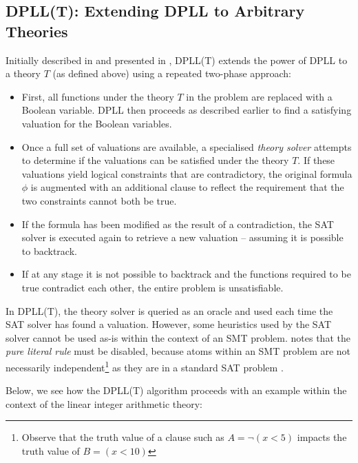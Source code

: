 \documentclass[a4paper,openany,12pt]{book}
\begin{document}
\subsection{DPLL(T): Extending DPLL to Arbitrary Theories}
\label{dpllt}
Initially described in \citet{ganzinger2004dpll} and presented in \citet{russell2016artificial}, DPLL(T) extends the
power of DPLL to a theory $T$ (as defined above) using a repeated two-phase approach:

\begin{itemize}
    \item First, all functions under the theory $T$ in the problem are replaced with a Boolean variable.
          DPLL then proceeds as described earlier to find a satisfying valuation for the Boolean variables.
    \item Once a full set of valuations are available, a specialised \emph{theory solver} attempts to determine if the
          valuations can be satisfied under the theory $T$.
          If these valuations yield logical constraints that are contradictory, the original formula $\phi$ is augmented
          with an additional clause to reflect the requirement that the two constraints cannot both be true.
    \item If the formula has been modified as the result of a contradiction, the SAT solver is executed again to
          retrieve a new valuation -- assuming it is possible to backtrack.
    \item If at any stage it is not possible to backtrack and the functions required to be true contradict each other,
          the entire problem is unsatisfiable.
\end{itemize}

In DPLL(T), the theory solver is queried as an oracle and used each time the SAT solver has found a valuation.
However, some heuristics used by the SAT solver cannot be used as-is within the context of an SMT problem.
\citeauthor{barrett2002sat} notes that the \emph{pure literal rule} must be disabled, because atoms within an SMT
problem are not necessarily independent\footnote{Observe that the truth value of a clause such as $A = \neg (x < 5)$ impacts the truth value of $B = (x < 10)$}
as they are in a standard SAT problem \citep{barrett2002sat}.

Below, we see how the DPLL(T) algorithm proceeds with an example within the context of the linear integer arithmetic
theory:
\end{document}
